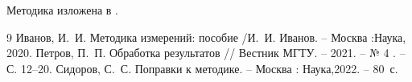 Методика изложена в \cite{ivanov}.

\begin{thebibliography}{9}
   Иванов, И.~И. Методика измерений: пособие /И.~И. Иванов. – Москва :Наука, 2020. %
   Петров, П.~П. Обработка результатов // Вестник МГТУ. – 2021. – № 4 . – С. 12--20. %
   Сидоров, С.~С. Поправки к методике. – Москва : Наука,2022. – 80~с. %
\end{thebibliography}
